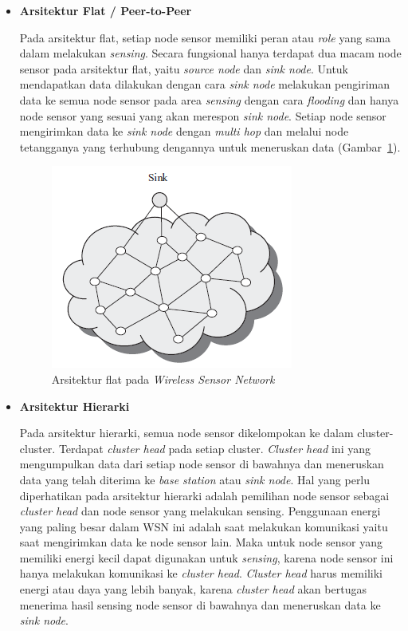 \documentclass[a4paper,twoside]{article}
\begin{document}
\begin{enumerate}
\begin{itemize}
\item \textbf{Arsitektur Flat / Peer-to-Peer}

Pada arsitektur flat, setiap node sensor memiliki peran atau \textit{role} yang sama dalam melakukan \textit{sensing}. Secara fungsional hanya terdapat dua macam node sensor pada arsitektur flat, yaitu \textit{source node} dan \textit{sink node}. Untuk mendapatkan data dilakukan dengan cara \textit{sink node} melakukan pengiriman data ke semua node sensor pada area \textit{sensing} dengan cara \textit{flooding} dan hanya node sensor yang sesuai yang akan merespon \textit{sink node}. Setiap node sensor mengirimkan data ke \textit{sink node} dengan \textit{multi hop} dan melalui node tetangganya yang terhubung dengannya untuk meneruskan data (Gambar~\ref{fig:flat}).
\begin{figure} [H]
	\centering  
	\includegraphics[scale=0.6]{Gambar/flat}  
	\caption[Arsitektur flat pada \textit{Wireless Sensor Network}]{Arsitektur flat pada \textit{Wireless Sensor Network}} 
	\label{fig:flat} 
\end{figure} 

\item \textbf{Arsitektur Hierarki}

Pada arsitektur hierarki, semua node sensor dikelompokan ke dalam cluster-cluster. Terdapat \textit{cluster head} pada setiap cluster. \textit{Cluster head} ini yang mengumpulkan data dari setiap node sensor di bawahnya dan meneruskan data yang telah diterima ke \textit{base station} atau \textit{sink node}. Hal yang perlu diperhatikan pada arsitektur hierarki adalah pemilihan node sensor sebagai \textit{cluster head} dan node sensor yang melakukan sensing. Penggunaan energi yang paling besar dalam WSN ini adalah saat melakukan komunikasi yaitu saat mengirimkan data ke node sensor lain. Maka untuk node sensor yang memiliki energi kecil dapat digunakan untuk \textit{sensing}, karena node sensor ini hanya melakukan komunikasi ke \textit{cluster head}. \textit{Cluster head} harus memiliki energi atau daya yang lebih banyak, karena \textit{cluster head} akan bertugas menerima hasil sensing node sensor di bawahnya dan meneruskan data ke \textit{sink node}. 


\end{itemize}
\end{enumerate}
\end{document}
